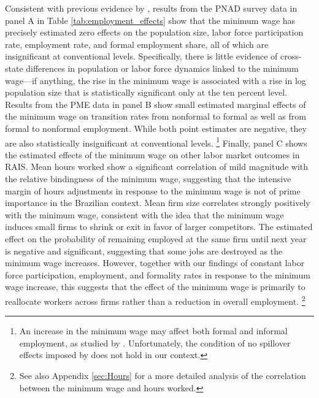 Consistent with previous evidence by \citet{Lemos2009}, results from the PNAD survey data in panel A in Table \ref{tab:employment_effects} show that the minimum wage has precisely estimated zero effects on the population size, labor force participation rate, employment rate, and formal employment share, all of which are insignificant at conventional levels. Specifically, there is little evidence of cross-state differences in population or labor force dynamics linked to the minimum wage---if anything, the rise in the minimum wage is associated with a rise in log population size that is statistically significant only at the ten percent level. Results from the PME data in panel B show small estimated marginal effects of the minimum wage on transition rates from nonformal to formal as well as from formal to nonformal employment. While both point estimates are negative, they are also statistically insignificant at conventional levels.%
%
\footnote{An increase in the minimum wage may affect both formal and informal employment, as studied by \citet{Jales2018}. Unfortunately, the condition of no spillover effects imposed by \citet{Jales2018} does not hold in our context.}
%
Finally, panel C shows the estimated effects of the minimum wage on other labor market outcomes in RAIS. Mean hours worked show a significant correlation of mild magnitude with the relative bindingness of the minimum wage, suggesting that the intensive margin of hours adjustments in response to the minimum wage \citep{Doppelt2019} is not of prime importance in the Brazilian context. Mean firm size correlates strongly positively with the minimum wage, consistent with the idea that the minimum wage induces small firms to shrink or exit in favor of larger competitors. The estimated effect on the probability of remaining employed at the same firm until next year is negative and significant, suggesting that some jobs are destroyed as the minimum wage increases. However, together with our findings of constant labor force participation, employment, and formality rates in response to the minimum wage increase, this suggests that the effect of the minimum wage is primarily to reallocate workers across firms rather than a reduction in overall employment.%
%
\footnote{See also Appendix \ref{sec:Hours} for a more detailed analysis of the correlation between the minimum wage and hours worked.} %
%

